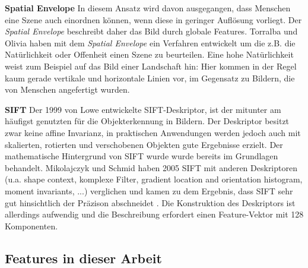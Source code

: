 \textbf{Spatial Envelope} In diesem Ansatz wird davon ausgegangen, dass Menschen eine Szene auch einordnen können, wenn diese in geringer Auflösung vorliegt. Der \textit{Spatial Envelope} beschreibt daher das Bild durch globale Features. Torralba und Olivia \cite{mts2001} haben mit dem  \textit{Spatial Envelope} ein Verfahren entwickelt um die z.B. die Natürlichkeit oder Offenheit einen Szene zu beurteilen. Eine hohe Natürlichkeit weist zum Beispiel auf das Bild einer Landschaft hin: Hier kommen in der Regel kaum gerade vertikale und horizontale Linien vor, im Gegensatz zu Bildern, die von Menschen angefertigt wurden.\newline

\textbf{SIFT} Der 1999 von Lowe entwickelte SIFT-Deskriptor, ist der mitunter am häufigst genutzten für die Objekterkennung in Bildern. Der Deskriptor besitzt zwar keine affine Invarianz, in praktischen Anwendungen werden jedoch auch mit skalierten, rotierten und verschobenen Objekten gute Ergebnisse erzielt.
Der mathematische Hintergrund von SIFT wurde wurde bereits im Grundlagen behandelt. Mikolajczyk und Schmid haben 2005 SIFT mit anderen Deskriptoren (u.a. shape context, komplexe Filter, gradient location and orientation histogram, moment invariants, ...) verglichen und kamen zu dem Ergebnis, dass SIFT sehr gut hinsichtlich der Präzison abschneidet \cite{idp2005}. Die Konstruktion des Deskriptors ist allerdings aufwendig und die Beschreibung erfordert einen Feature-Vektor mit 128 Komponenten.\newline

\subsection{Features in dieser Arbeit}


